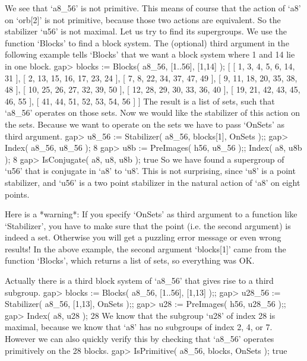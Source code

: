 We see that `a8_56'   is not primitive. This  means  of course   that the
action  of `a8'  on  `orb[2]'  is not  primitive,  because those   two
actions are equivalent. So the stabilizer `u56' is not maximal. Let us
try to find its supergroups. We use the function `Blocks' to find a block
system. The  (optional) third  argument  in the following   example tells
`Blocks' that we want a block system where 1 and 14 lie in one block.
\beginexample
gap> blocks := Blocks( a8_56, [1..56], [1,14] );
[ [ 1, 3, 4, 5, 6, 14, 31 ], [ 2, 13, 15, 16, 17, 23, 24 ], 
  [ 7, 8, 22, 34, 37, 47, 49 ], [ 9, 11, 18, 20, 35, 38, 48 ], 
  [ 10, 25, 26, 27, 32, 39, 50 ], [ 12, 28, 29, 30, 33, 36, 40 ], 
  [ 19, 21, 42, 43, 45, 46, 55 ], [ 41, 44, 51, 52, 53, 54, 56 ] ]
\endexample
The result is a list  of sets, such that  `a8_56' operates on those sets.
Now we would like  the stabilizer of this  action on the sets. Because
we  want to operate on   the sets we  have  to  pass `OnSets' as  third
argument.
\beginexample
gap> u8_56 := Stabilizer( a8_56, blocks[1], OnSets );;
gap> Index( a8_56, u8_56 );
8
gap> u8b := PreImages( h56, u8_56 );; Index( a8, u8b );
8
gap> IsConjugate( a8, u8, u8b );
true
\endexample
So we have found a supergroup of `u56' that is conjugate in `a8' to `u8'.
This is not surprising, since `u8' is a point stabilizer, and `u56' is a
two point stabilizer in the natural action of `a8' on eight points.

Here  is a *warning*:   If you specify `OnSets'  as  third argument  to a
function like  `Stabilizer', you have to  make sure that the  point (i.e.
the second argument) is  indeed a set. Otherwise you  will get a puzzling
error message or  even  wrong results! In  the above  example, the second
argument  `blocks[1]'  came from the  function  `Blocks', which returns a
list of sets, so everything was OK.

Actually there  is a third  block system of `a8_56'  that gives rise to a
third subgroup.
\beginexample
gap> blocks := Blocks( a8_56, [1..56], [1,13] );;
gap> u28_56 := Stabilizer( a8_56, [1,13], OnSets );;
gap> u28 := PreImages( h56, u28_56 );;
gap> Index( a8, u28 );
28
\endexample
We know that  the subgroup `u28' of index  28 is maximal, because we know
that  `a8' has no  subgroups  of index 2,  4,  or 7.  However we can also
quickly verify this by checking  that `a8_56' operates primitively on the
28 blocks.
\beginexample
gap> IsPrimitive( a8_56, blocks, OnSets );
true
\endexample

